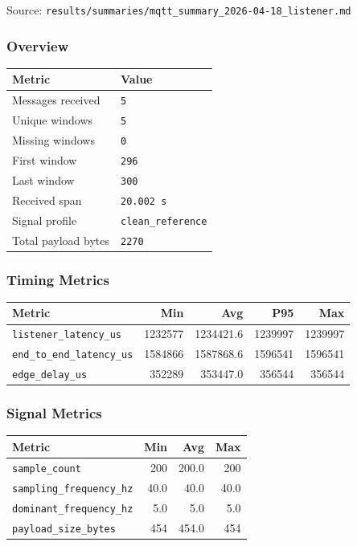\documentclass[12pt,a4paper]{article}
\begin{document}
Source: \texttt{results/summaries/mqtt\_summary\_2026-04-18\_listener.md}

\subsubsection*{Overview}

\begin{center}
\begin{tabular}{|l|l|}
\hline
\textbf{Metric} & \textbf{Value} \\
\hline
Messages received & \texttt{5} \\
\hline
Unique windows & \texttt{5} \\
\hline
Missing windows & \texttt{0} \\
\hline
First window & \texttt{296} \\
\hline
Last window & \texttt{300} \\
\hline
Received span & \texttt{20.002 s} \\
\hline
Signal profile & \texttt{clean\_reference} \\
\hline
Total payload bytes & \texttt{2270} \\
\hline
\end{tabular}
\end{center}

\subsubsection*{Timing Metrics}

\begin{center}
\begin{tabular}{|l|r|r|r|r|}
\hline
\textbf{Metric} & \textbf{Min} & \textbf{Avg} & \textbf{P95} & \textbf{Max} \\
\hline
\texttt{listener\_latency\_us} & 1232577 & 1234421.6 & 1239997 & 1239997 \\
\hline
\texttt{end\_to\_end\_latency\_us} & 1584866 & 1587868.6 & 1596541 & 1596541 \\
\hline
\texttt{edge\_delay\_us} & 352289 & 353447.0 & 356544 & 356544 \\
\hline
\end{tabular}
\end{center}

\subsubsection*{Signal Metrics}

\begin{center}
\begin{tabular}{|l|r|r|r|}
\hline
\textbf{Metric} & \textbf{Min} & \textbf{Avg} & \textbf{Max} \\
\hline
\texttt{sample\_count} & 200 & 200.0 & 200 \\
\hline
\texttt{sampling\_frequency\_hz} & 40.0 & 40.0 & 40.0 \\
\hline
\texttt{dominant\_frequency\_hz} & 5.0 & 5.0 & 5.0 \\
\hline
\texttt{payload\_size\_bytes} & 454 & 454.0 & 454 \\
\hline
\end{tabular}
\end{center}
\end{document}

